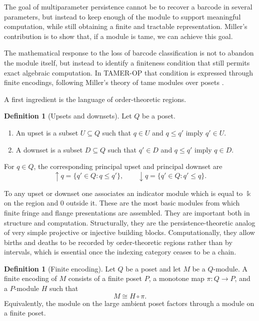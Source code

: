 \documentclass[11pt]{article}
\newcommand{\kk}{\Bbbk}
\newcommand{\TAMER}{\textsc{TAMER-OP}}
\theoremstyle{definition}
\newtheorem{defn}[theorem]{Definition}
\theoremstyle{remark}
\begin{document}
The goal of multiparameter persistence cannot be to recover a barcode in several parameters, but instead to keep enough of the module to support meaningful computation, while still obtaining a finite and tractable representation. Miller's contribution is to show that, if a module is tame, we can achieve this goal.

The mathematical response to the loss of barcode classification is not to abandon the module itself, but instead to identify a finiteness condition that still permits exact algebraic computation.  In \TAMER{} that condition is expressed through finite encodings, following Miller's theory of tame modules over posets \cite{Mil20}.

A first ingredient is the language of order-theoretic regions.

\begin{defn}[Upsets and downsets]
	Let $Q$ be a poset.
	\begin{enumerate}[label=(\roman*)]
		\item An upset is a subset $U\subseteq Q$ such that $q\in U$ and $q\leq q'$ imply $q'\in U$.
		\item A downset is a subset $D\subseteq Q$ such that $q'\in D$ and $q\leq q'$ imply $q\in D$.
	\end{enumerate}
	For $q\in Q$, the corresponding principal upset and principal downset are
	\[
	\uparrow q = \{q'\in Q : q\leq q'\}, \qquad
	\downarrow q = \{q'\in Q : q'\leq q\}.
	\]
\end{defn}

To any upset or downset one associates an indicator module which is equal to $\kk$ on the region and $0$ outside it.  These are the most basic modules from which finite fringe and flange presentations are assembled.  They are important both in structure and computation.  Structurally, they are the persistence-theoretic analog of very simple projective or injective building blocks.  Computationally, they allow births and deaths to be recorded by order-theoretic regions rather than by intervals, which is essential once the indexing category ceases to be a chain.

\begin{defn}[Finite encoding]
	Let $Q$ be a poset and let $M$ be a $Q$-module.  A finite encoding of $M$ consists of a finite poset $P$, a monotone map $\pi\colon Q\to P$, and a $P$-module $H$ such that
	\[
	M \cong H\circ \pi.
	\]
	Equivalently, the module on the large ambient poset factors through a module on a finite poset.
\end{defn}
\end{document}
